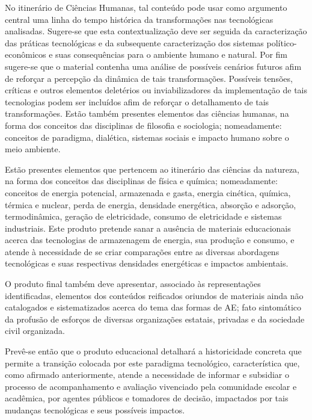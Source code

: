 \documentclass[
  12pt,       %
  openright,      %
  twoside,      %
  a4paper,      %
  english,      %
  french,       %
  spanish,      %
  brazil        %
  ]{abntex2}
\begin{document}
No itinerário de Ciências Humanas, tal conteúdo pode usar como argumento central uma linha do tempo histórica da transformações nas tecnológicas analisadas. Sugere-se que esta contextualização deve ser seguida da caracterização das práticas tecnológicas e da subsequente caracterização dos sistemas político-econômicos e suas consequências para o ambiente humano e natural. Por fim sugere-se que o material contenha uma análise de possíveis cenários futuros afim de reforçar a percepção da dinâmica de tais transformações. Possíveis tensões, críticas e outros elementos deletérios ou inviabilizadores da implementação de tais tecnologias podem ser incluídos afim de reforçar o detalhamento de tais transformações. Estão também presentes elementos das ciências humanas, na forma dos conceitos das disciplinas de filosofia e sociologia; nomeadamente: conceitos de paradigma, dialética, sistemas sociais e impacto humano sobre o meio ambiente.

Estão presentes elementos que pertencem ao itinerário das ciências da natureza, na forma dos conceitos das disciplinas de física e química; nomeadamente: conceitos de energia potencial, armazenada e gasta, energia cinética, química, térmica e nuclear, perda de energia, densidade energética, absorção e adsorção, termodinâmica, geração de eletricidade, consumo de eletricidade e sistemas industriais. Este produto pretende sanar a ausência de materiais educacionais acerca das tecnologias de armazenagem de energia, sua produção e consumo, e atende à necessidade de se criar comparações entre as diversas abordagens tecnológicas e suas respectivas densidades energéticas e impactos ambientais.

O produto final também deve apresentar, associado às representações identificadas, elementos dos conteúdos reificados oriundos de materiais ainda não catalogados e sistematizados acerca do tema das formas de AE; fato sintomático da profusão de esforços de diversas organizações estatais, privadas e da sociedade civil organizada.

Prevê-se então que o produto educacional detalhará a historicidade concreta que permite a transição colocada por este paradigma tecnológico, característica que, como afirmado anteriormente, atende a necessidade de informar e subsidiar o processo de acompanhamento e avaliação vivenciado pela comunidade escolar e acadêmica, por agentes públicos e tomadores de decisão, impactados por tais mudanças tecnológicas e seus possíveis impactos.
\end{document}
